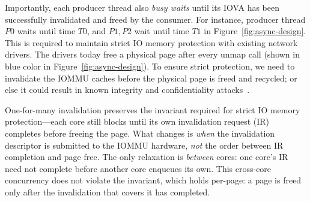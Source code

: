     Importantly, each producer thread also {\em busy waits} until its IOVA has been successfully invalidated and freed by the consumer. For instance, producer thread $P0$ waits until time $T0$, and $P1,P2$ wait until time $T1$ in Figure~\ref{fig:async-design}. This is required to maintain strict IO memory protection with existing network drivers. The drivers today free a physical page after every unmap call (shown in blue color in Figure~\ref{fig:async-design}). To ensure strict protection, we need to invalidate the IOMMU caches before the physical page is freed and recycled; or else it could result in known integrity and confidentiality attacks~\cite{RajapakshaIOMMU}. 
    
One-for-many invalidation preserves the invariant required for strict IO memory protection---each core still blocks until 
    its own invalidation request (IR) completes before freeing the page.
What changes is \emph{when} the invalidation descriptor is submitted to the IOMMU hardware, 
    {\it not} the order between IR completion and page free.
The only relaxation is \emph{between} cores: one core's IR need not complete before another core enqueues its own.
This cross-core concurrency does not violate the invariant, 
    which holds per-page: a page is freed only after the invalidation that covers it has completed. 


    
  

    

    
